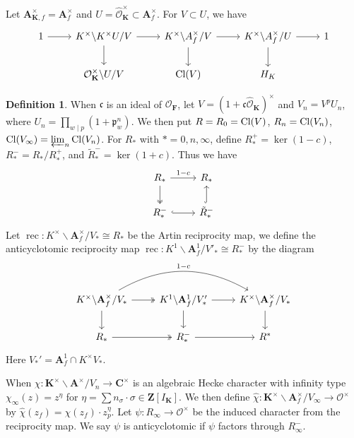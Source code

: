 \documentclass[leqno]{amsart}
\DeclareMathOperator{\rec}{rec}
\newcommand{\Z}{{\mathbf{Z}}}
\newcommand{\C}{\mathbf C}
\newcommand{\A}{\mathbf A}
\newcommand{\F}{{\mathbf{F}}} %
\newcommand{\K}{{\mathbf{K}}} %
\newcommand{\oo}{\mathcal{O}} %
\newcommand{\fc}{\mathfrak{c}}
\newcommand{\fp}{\mathfrak{p}}
\theoremstyle{definition}
\newtheorem{defn}[thm]{Definition}
\theoremstyle{remark}
\begin{document}
Let $\A_{\K,f}^\times=\A_f^\times$
and $U=\hat{\oo}_\K^\times\subset \A_f^\times$.
For $V\subset U$, we have
\[
	\begin{tikzcd}
	1\arrow[r]&
	K^\times\backslash K^\times U/V
	\arrow[r] \arrow[d]&
	K^\times\backslash A_f^\times/V
	\arrow[r] \arrow[d]&
	K^\times\backslash A_f^\times/U
	\arrow[r] \arrow[d]&1\\
	   & \oo_\K^\times\backslash U/V&
	   \textnormal{Cl}(V)&
	   H_K&
	\end{tikzcd}
\]
\begin{defn}
When $\fc$ is an ideal of  $\oo_\F$,
let  $V=(1+\fc\hat{\oo}_\K)^\times$
and $V_n=V^pU_n$, where
$U_n=\prod_{w\mid p}(1+\fp_w^n)$.
We then put
$R=R_0=\textnormal{Cl}(V)$,
$R_n=\textnormal{Cl}(V_n)$,
$\textnormal{Cl}(V_\infty)=\varprojlim_n\textnormal{Cl}(V_n)$.
For $R_*$ with  $*=0,n,\infty$,
define 
$R_*^+=\ker(1-c)$,
$R_*^-=R_*/R_*^+$,
and $\tilde{R}_{*}^-=\ker(1+c)$.
Thus we have 
\[
\begin{tikzcd}
	R_* \arrow[r,"1-c"]\arrow[d,twoheadrightarrow]&
	R_*\\
	R_*^- \arrow[r,hookrightarrow] &
	\tilde{R}_*^-\arrow[u,hookrightarrow]
\end{tikzcd}
\]
Let $\rec\colon K^\times\backslash \A_f^\times/V_*\cong R_*$ 
be the Artin reciprocity map, we define 
the anticyclotomic reciprocity map
$\rec\colon K^1\backslash \A_f^1/V'_*\cong R_*^-$
by the diagram
\[
\begin{tikzcd}
K^\times\backslash \A_f^\times/V_*
\arrow[r,twoheadrightarrow] \arrow[d]
\arrow[rr,bend left,"1-c"] &
K^1\backslash \A_f^1/V'_*
\arrow[r] \arrow[d] &
K^\times\backslash \A_f^\times/V_*
\arrow[d]\\
R_* \arrow[r,twoheadrightarrow] &
R_*^- \arrow[r] & R^*
\end{tikzcd}
\]
Here $V_*'=\A_f^1\cap K^\times V_*$.
\end{defn}

When $\chi\colon\K^\times\backslash\A^\times/V_n\to \C^\times$
is an algebraic Hecke character 
with infinity type  $\chi_\infty(z)=z^\eta$
for $\eta=\sum n_\sigma\cdot\sigma\in \Z[I_\K]$.
We then define 
$\hat{\chi}\colon \K^\times\backslash\A_f^\times/V_\infty
\to \oo^\times$ by 
$ \hat{\chi}(z_f)=\chi(z_f)\cdot z_p^\eta$.
Let $\psi\colon R_\infty\to \oo^\times$
be the induced character from the reciprocity map.
We say  $\psi$ is anticyclotomic if
$\psi$ factors through $R_\infty^-$.
\end{document}
